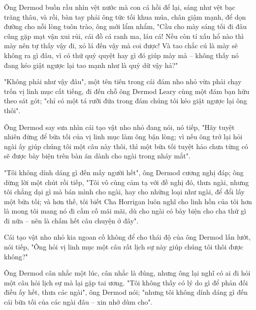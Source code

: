 Ông Dermod buồn rầu nhìn vệt nước mà con cá hồi để lại, sáng như vệt bạc trăng thâu, và rồi, bàn tay phải ông tức tối khua múa, chân giậm mạnh, để dọn đường cho nỗi lòng tuôn trào, ông mới lẩm nhẩm, "Cầu cho mày sáng tối đi đâu cũng gặp mạt vận xui rủi, cái đồ cá ranh ma, láu cá! Nếu còn tí xấu hổ nào thì mày nên tự thấy vậy đi, xỏ lá đến vậy mà coi được! Và tao chắc cú là mày sẽ không ra gì đâu, vì có thứ quỷ quyệt hay gì đó giúp mày mà – không thấy nó đang kéo giật ngược lại tao mạnh như là quỷ dữ vậy hả?"

"Không phải như vậy đâu", một tên tiên trong cái đám nho nhỏ vừa phải chạy trốn vị linh mục cất tiếng, đi đến chỗ ông Dermod Leary cùng một đám bạn hữu theo sát gót; "chỉ có một tá rưỡi đứa trong đám chúng tôi kéo giật ngược lại ông thôi".

Ông Dermod say sưa nhìn cái tạo vật nho nhỏ đang nói, nó tiếp, "Hãy tuyệt nhiên đừng để bữa tối của vị linh mục làm ông bận lòng; vì nếu ông trở lại hỏi ngài ấy giúp chúng tôi một câu này thôi, thì một bữa tối tuyệt hảo chưa từng có sẽ được bày biện trên bàn ăn dành cho ngài trong nháy mắt".

"Tôi không dính dáng gì đến mấy người hết", ông Dermod cương nghị đáp; ông dừng lời một chút rồi tiếp, "Tôi vô cùng cảm tạ với đề nghị đó, thưa ngài, nhưng tôi chẳng dại gì mà bán mình cho ngài, hay cho những loại như ngài, để đổi lấy một bữa tối; và hơn thế, tôi biết Cha Horrigan luôn nghĩ cho linh hồn của tôi hơn là mong tôi mang nó đi cầm cố mãi mãi, dù cho ngài có bày biện cho cha thứ gì đi nữa – nên là chấm hết câu chuyện ở đây".

Cái tạo vật nho nhỏ kia ngoan cố không để cho thái độ của ông Dermod lấn lướt, nói tiếp, "Ông hỏi vị linh mục một câu rất lịch sự này giúp chúng tôi thôi được không?"

Ông Dermod cân nhắc một lúc, cân nhắc là đúng, nhưng ông lại nghĩ có ai đi hỏi một câu hỏi lịch sự mà lại gặp tai ương. "Tôi không thấy có lý do gì để phản đối điều ấy hết, thưa các ngài", ông Dermod nói; "nhưng tôi không dính dáng gì đến cái bữa tối của các ngài đâu – xin nhớ dùm cho".
